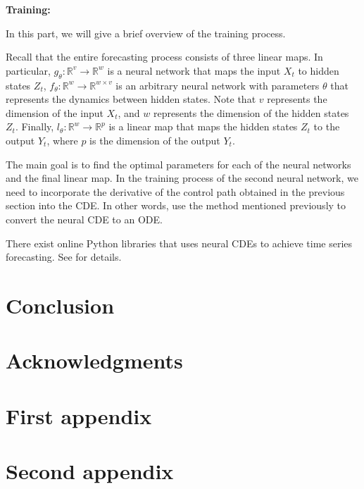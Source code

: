 \documentclass[a4paper,11pt,titlepage]{article}
\theoremstyle{definition}
\theoremstyle{plain}
\theoremstyle{remark}
\begin{document}
\textbf{Training:}

In this part, we will give a brief overview of the training process.

Recall that the entire forecasting process consists of three linear maps. In particular, $g_\theta:\mathbb{R}^v\rightarrow\mathbb{R}^w$ is a neural network that maps the input $X_t$ to hidden states $Z_t$, $f_\theta:\mathbb{R}^w\rightarrow\mathbb{R}^{w\times v}$ is an arbitrary neural network with parameters $\theta$ that represents the dynamics between hidden states. Note that $v$ represents the dimension of the input $X_t$, and $w$ represents the dimension of the hidden states $Z_t$. Finally, $l_\theta:\mathbb{R}^w\rightarrow\mathbb{R}^p$ is a linear map that maps the hidden states $Z_t$ to the output $Y_t$, where $p$ is the dimension of the output $Y_t$.

The main goal is to find the optimal parameters for each of the neural networks and the final linear map. In the training process of the second neural network, we need to incorporate the derivative of the control path obtained in the previous section into the CDE. In other words, use the method mentioned previously to convert the neural CDE to an ODE.

There exist online Python libraries that uses neural CDEs to achieve time series forecasting. See \cite{Jhin2023} for details.

\pagebreak
\section{Conclusion}

\section*{Acknowledgments}

\appendix

\pagebreak
\section{First appendix}

\pagebreak
\section{Second appendix}

\pagebreak

\end{document}
